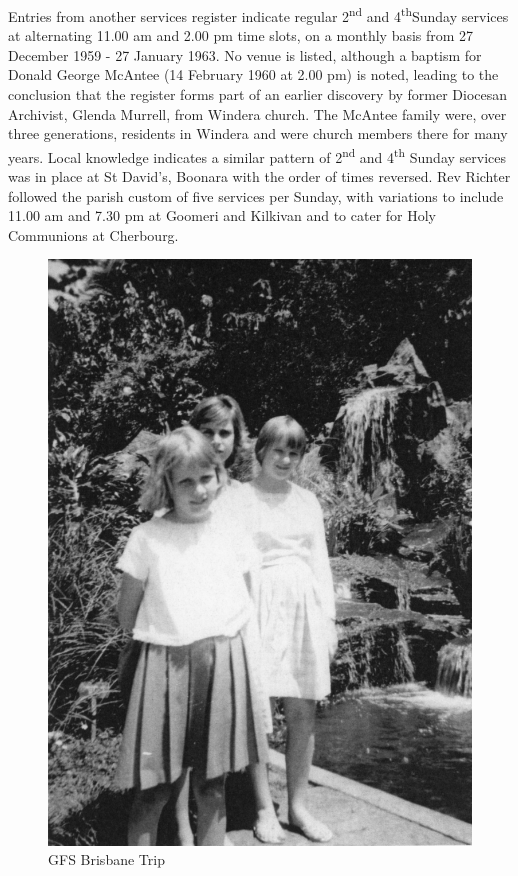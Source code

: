 Entries from another services register indicate regular 2\textsuperscript{nd} and 4\textsuperscript{th}Sunday services at alternating 11.00 am and 2.00 pm time slots, on a monthly basis from 27 December 1959 - 27 January 1963. No venue is listed, although a baptism for Donald George McAntee (14 February 1960 at 2.00 pm) is noted, leading to the conclusion that the register forms part of an earlier discovery by former Diocesan Archivist, Glenda Murrell, from Windera church. The McAntee family were, over three generations, residents in Windera and were church members there for many years. Local knowledge indicates a similar pattern of 2\textsuperscript{nd} and 4\textsuperscript{th} Sunday services was in place at St David's, Boonara with the order of times reversed. Rev Richter followed the parish custom of five services per Sunday, with variations to include 11.00 am and 7.30 pm at Goomeri and Kilkivan and to cater for Holy Communions at Cherbourg.









\begin{figure}
\begin{center}
\includegraphics[width=.6\linewidth,center]{../images/gfsBrisbaneTrip.jpg}
\caption{GFS Brisbane Trip}
\end{center}
\end{figure}




